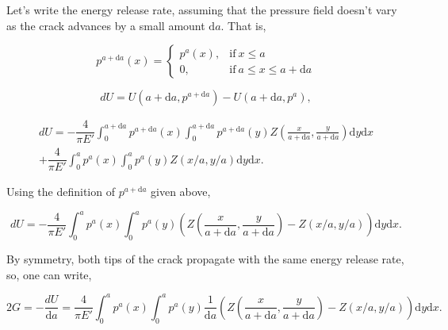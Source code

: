 

\noindent Let's write the energy release rate, assuming that the pressure field doesn't vary as the crack advances by a small amount $\text{d}a$. That is,

\begin{equation}
    p^{a+\text{d}a}(x) = 
    \begin{cases}
      p^{a}(x), & \text{if}\ x\le a \\
      0, & \text{if}\ a \le x \le a+\text{d}a
    \end{cases} 
\end{equation}

\begin{equation}
    dU = U(a+\text{d}a, p^{a+\text{d}a}) - U(a+\text{d}a, p^{a}), 
\end{equation}

\begin{multline}
       dU =  -\dfrac{4}{\pi E'}\int_{0}^{a+\text{d}a} p^{a+\text{d}a}(x)\int_0^{a+\text{d}a} p^{a+\text{d}a}(y)Z(\frac{x}{a+\text{d}a}, \frac{y}{a+\text{d}a}) \text{d}y\text{d}x \\ + \dfrac{4}{\pi E'}\int_{0}^a p^{a}(x)\int_0^a p^{a}(y)Z(x/a, y/a) \text{d}y\text{d}x.
\end{multline}

\noindent Using the definition of $p^{a+\text{d}a}$ given above,

\begin{equation}
       dU =  -\dfrac{4}{\pi E'}\int_{0}^{a} p^{a}(x)\int_0^{a} p^{a}(y)\left(Z(\frac{x}{a+\text{d}a}, \frac{y}{a+\text{d}a}) - Z(x/a, y/a)\right)\text{d}y\text{d}x.
\end{equation}

\noindent By symmetry, both tips of the crack propagate with the same energy release rate, so, one can write,

\begin{equation}
    2G = -\dfrac{dU}{\text{d}a} = \dfrac{4}{\pi E'}\int_{0}^{a} p^{a}(x)\int_0^{a} p^{a}(y)\dfrac{1}{\text{d}a}\left(Z(\frac{x}{a+\text{d}a}, \frac{y}{a+\text{d}a}) - Z(x/a, y/a)\right)\text{d}y\text{d}x.
\end{equation}

